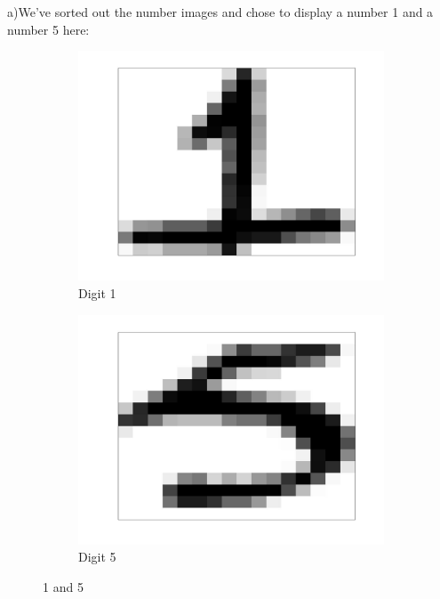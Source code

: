 \documentclass[12pt]{article}
\begin{document}
\newpage
{} \\\\
a)We've sorted out the number images and chose to display a number 1 and a number 5 here:
\begin{figure}[H]
\centering
\begin{subfigure}{.5\textwidth}
  \centering
   \includegraphics[scale = 0.05]{1.jpg}
  \caption{Digit 1}
  \label{fig:1}
\end{subfigure}%
\begin{subfigure}{.5\textwidth}
  \centering
   \includegraphics[scale = 0.05]{5.jpg}
  \caption{Digit 5}
  \label{fig:5}
\end{subfigure}
\caption{1 and 5}
\label{fig:test}
\end{figure}
\end{document}
